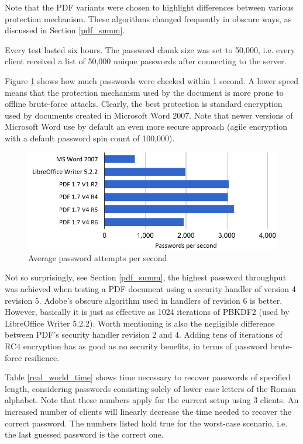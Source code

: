 \documentclass[11pt,oneside]{fithesis2}
\begin{document}
Note that the PDF variants were chosen to highlight differences between various protection mechanism. These algorithms changed frequently in obscure ways, as discussed in Section \ref{pdf_summ}.

Every test lasted six hours. The password chunk size was set to 50,000, i.e. every client received a list of 50,000 unique passwords after connecting to the server. 

Figure \ref{average_speed} shows how much passwords were checked within 1 second. A lower speed means that the protection mechanism used by the document is more prone to offline brute-force attacks. Clearly, the best protection is standard encryption used by documents created in Microsoft Word 2007. Note that newer versions of Microsoft Word use by default an even more secure approach (agile encryption with a default password spin count of 100,000).

\begin{figure}[ht]
	\centering
	\includegraphics[width=1\textwidth]{figures/average_speed.pdf}
	\caption{Average password attempts per second}
	\label{average_speed}
\end{figure}

Not so surprisingly, see Section \ref{pdf_summ}, the highest password throughput was achieved when testing a PDF document using a security handler of version 4 revision 5. Adobe's obscure algorithm used in handlers of revision 6 is better. However, basically it is just as effective as 1024 iterations of PBKDF2 (used by LibreOffice Writer 5.2.2).  Worth mentioning is also the negligible difference between PDF's security handler revision 2 and 4. Adding tens of iterations of RC4 encryption has as good as no security benefits, in terms of password brute-force resilience. 

Table \ref{real_world_time} shows time necessary to recover passwords of specified length, considering passwords consisting solely of lower case letters of the Roman alphabet. Note that these numbers apply for the current setup using 3 clients. An increased number of clients will linearly decrease the time needed to recover the correct password. The numbers listed hold true for the worst-case scenario, i.e. the last guessed password is the correct one.
\end{document}
